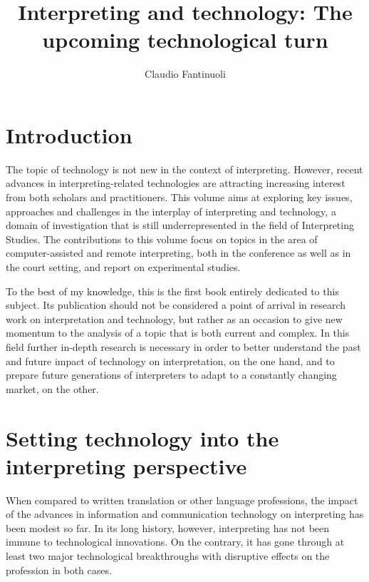 \documentclass[output=paper]{langsci/langscibook}
\title{Interpreting and technology: The upcoming technological turn}
\author{Claudio Fantinuoli\affiliation{University of Mainz}}
\begin{document}
\maketitle


 

 
\section{Introduction} 
 
The topic of technology is not new in the context of interpreting. However, recent advances in interpreting-related technologies are attracting increasing interest from both scholars and practitioners. This volume aims at exploring key issues, approaches and challenges in the interplay of interpreting and technology, a domain of investigation that is still underrepresented in the field of Interpreting Studies. The contributions to this volume focus on topics in the area of computer-assisted and remote interpreting, both in the conference as well as in the court setting, and report on experimental studies.
 
To the best of my knowledge, this is the first book entirely dedicated to this subject. Its publication should not be considered a point of arrival in research work on interpretation and technology, but rather as an occasion to give new momentum to the analysis of a topic that is both current and complex. In this field further in-depth research is necessary in order to better understand the past and future impact of technology on interpretation, on the one hand, and to prepare future generations of interpreters to adapt to a constantly changing market, on the other.
 
\section{Setting technology into the interpreting perspective} 
When compared to written translation or other language professions, the impact of the advances in information and communication technology on interpreting has been modest so far. In its long history, however, interpreting has not been immune to technological innovations. On the contrary, it has gone through at least two major technological breakthroughs with disruptive effects on the profession in both cases. 
 
\end{document}
